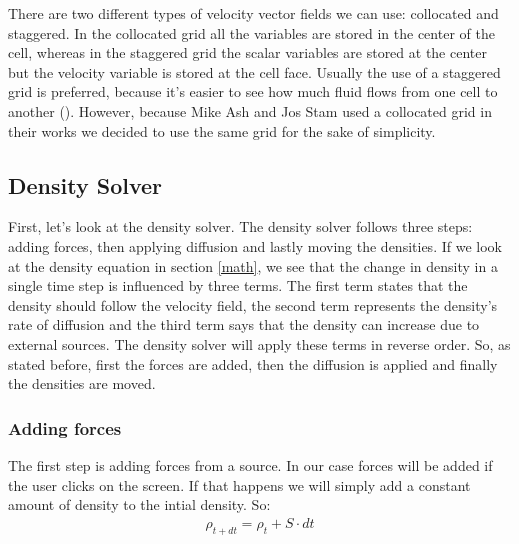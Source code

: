 \documentclass[a4paper,12pt,titlepage]{article}
\begin{document}
There are two different types of velocity vector fields we can use: collocated and staggered.
In the collocated grid all the variables are stored in the center of the cell,
whereas in the staggered grid the scalar variables are stored at the center but the velocity variable is stored at the cell face. 
Usually the use of a staggered grid is preferred, because it's easier to see how much fluid flows from one cell to another (\cite{tenminute}).
However, because Mike Ash and Jos Stam used a collocated grid in their works we decided to use the same grid for the sake of simplicity.

\subsection{Density Solver} \label{density}

First, let's look at the density solver. The density solver follows three steps:
adding forces, then applying diffusion and lastly moving the densities. 
If we look at the density equation in section \ref{math}, we see that the change in density in a single time step is influenced by three terms. 
The first term states that the density should follow the velocity field,
the second term represents the density's rate of diffusion
and the third term says that the density can increase due to external sources. 
The density solver will apply these terms in reverse order. 
So, as stated before, first the forces are added, then the diffusion is applied and finally the densities are moved.

\subsubsection{Adding forces}
The first step is adding forces from a source. In our case forces will be added if the user clicks on the screen.
If that happens we will simply add a constant amount of density to the intial density. So:
\[
\begin{array}{ll}
  \rho_{t+dt} = \rho_t + S \cdot dt
\end{array}
\]
\end{document}
